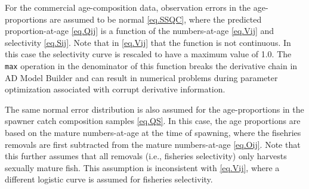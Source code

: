 \documentclass[12pt,letterpaper]{article}
\begin{document}
    For the commercial age-composition data, observation errors in the age-proportions are assumed to be normal \eqref{eq.SSQC}, where the predicted proportion-at-age \eqref{eq.Qij} is a function of the numbers-at-age \eqref{eq.Vij} and selectivity \eqref{eq.Sij}. Note that in \eqref{eq.Vij} that the function is not continuous. In this case the selectivity curve is rescaled to have a maximum value of 1.0. The \texttt{max} operation in the denominator of this function breaks the derivative chain in AD Model Builder and can result in numerical problems during parameter optimization associated with corrupt derivative information. 

    The same normal error distribution is also assumed for the age-proportions in the spawner catch composition samples \eqref{eq.QS}.  In this case, the age proportions are based on the mature numbers-at-age at the time of spawning, where the fisehries removals are first subtracted from the mature numbers-at-age \eqref{eq.Oij}.  Note that this further assumes that all removals (i.e., fisheries selectivity) only harvests sexually mature fish.  This assumption is inconsistent with \eqref{eq.Vij}, where a different logistic curve is assumed for fisheries selectivity.  
\end{document}
